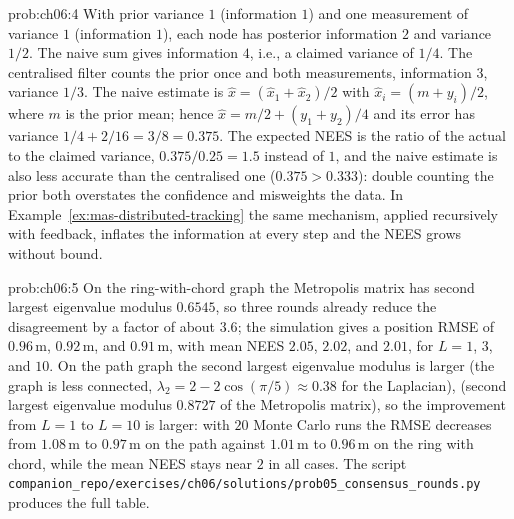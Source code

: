 \documentclass[graybox,envcountchap]{style/SNmono}
\newcommand{\repopath}[1]{\texttt{#1}}
\begin{document}
\begin{sol}{prob:ch06:4}
With prior variance $1$ (information $1$) and one measurement of variance $1$ (information $1$), each node has posterior information $2$ and variance $1/2$. The naive sum gives information $4$, i.e., a claimed variance of $1/4$. The centralised filter counts the prior once and both measurements, information $3$, variance $1/3$. The naive estimate is $\widehat{x}=(\widehat{x}_1+\widehat{x}_2)/2$ with $\widehat{x}_i=(m+y_i)/2$, where $m$ is the prior mean; hence $\widehat{x}=m/2+(y_1+y_2)/4$ and its error has variance $1/4+2/16=3/8=0.375$. The expected NEES is the ratio of the actual to the claimed variance, $0.375/0.25=1.5$ instead of $1$, and the naive estimate is also less accurate than the centralised one ($0.375>0.333$): double counting the prior both overstates the confidence and misweights the data. In Example~\ref{ex:mas-distributed-tracking} the same mechanism, applied recursively with feedback, inflates the information at every step and the NEES grows without bound.
\end{sol}

\begin{sol}{prob:ch06:5}
On the ring-with-chord graph the Metropolis matrix has second largest eigenvalue modulus $0.6545$, so three rounds already reduce the disagreement by a factor of about $3.6$; the simulation gives a position RMSE of $0.96$\,m, $0.92$\,m, and $0.91$\,m, with mean NEES $2.05$, $2.02$, and $2.01$, for $L=1$, $3$, and $10$. On the path graph the second largest eigenvalue modulus is larger (the graph is less connected, $\lambda_2=2-2\cos(\pi/5)\approx0.38$ for the Laplacian), (second largest eigenvalue modulus $0.8727$ of the Metropolis matrix), so the improvement from $L=1$ to $L=10$ is larger: with $20$ Monte Carlo runs the RMSE decreases from $1.08$\,m to $0.97$\,m on the path against $1.01$\,m to $0.96$\,m on the ring with chord, while the mean NEES stays near $2$ in all cases. The script \repopath{companion\_\allowbreak repo/\allowbreak exercises/\allowbreak ch06/\allowbreak solutions/\allowbreak prob05\_\allowbreak consensus\_\allowbreak rounds.py} produces the full table.
\end{sol}
\end{document}

